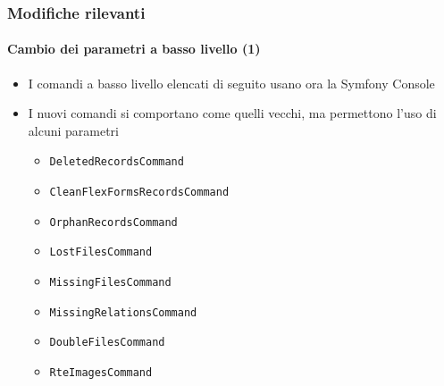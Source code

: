 \begin{frame}[fragile]
	\frametitle{Modifiche rilevanti}
	\framesubtitle{Cambio dei parametri a basso livello (1)}


	\begin{itemize}
		\item I comandi a basso livello elencati di seguito usano ora la Symfony Console 
		\item I nuovi comandi si comportano come quelli vecchi, ma permettono l'uso di alcuni parametri

			\begin{itemize}
				\item \texttt{DeletedRecordsCommand}
				\item \texttt{CleanFlexFormsRecordsCommand}
				\item \texttt{OrphanRecordsCommand}
				\item \texttt{LostFilesCommand}
				\item \texttt{MissingFilesCommand}
				\item \texttt{MissingRelationsCommand}
				\item \texttt{DoubleFilesCommand}
				\item \texttt{RteImagesCommand}
			\end{itemize}

	\end{itemize}

\end{frame}



